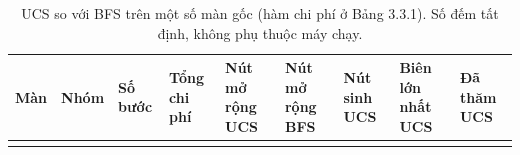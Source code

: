 \begin{longtable}[]{@{}
  >{\raggedright\arraybackslash}p{}
  >{\raggedright\arraybackslash}p{}
  >{\raggedright\arraybackslash}p{}
  >{\raggedright\arraybackslash}p{}
  >{\raggedright\arraybackslash}p{}
  >{\raggedright\arraybackslash}p{}
  >{\raggedright\arraybackslash}p{}
  >{\raggedright\arraybackslash}p{}
  >{\raggedright\arraybackslash}p{}@{}}
\caption{ UCS so với BFS trên một số màn gốc (hàm chi phí ở Bảng 3.3.1). Số đếm tất định, không phụ thuộc máy chạy.}\tabularnewline
\toprule\noalign{}
\rowcolor{tablehead}\begin{minipage}[b]{\linewidth}\raggedright
\textbf{Màn}
\end{minipage} & \begin{minipage}[b]{\linewidth}\raggedright
\textbf{Nhóm}
\end{minipage} & \begin{minipage}[b]{\linewidth}\raggedright
\textbf{Số bước}
\end{minipage} & \begin{minipage}[b]{\linewidth}\raggedright
\textbf{Tổng chi phí}
\end{minipage} & \begin{minipage}[b]{\linewidth}\raggedright
\textbf{Nút mở rộng UCS}
\end{minipage} & \begin{minipage}[b]{\linewidth}\raggedright
\textbf{Nút mở rộng BFS}
\end{minipage} & \begin{minipage}[b]{\linewidth}\raggedright
\textbf{Nút sinh UCS}
\end{minipage} & \begin{minipage}[b]{\linewidth}\raggedright
\textbf{Biên lớn nhất UCS}
\end{minipage} & \begin{minipage}[b]{\linewidth}\raggedright
\textbf{Đã thăm UCS}
\end{minipage} \\
\midrule\noalign{}
\endfirsthead
\toprule\noalign{}
\rowcolor{tablehead}\begin{minipage}[b]{\linewidth}\raggedright

\end{minipage}
\end{longtable}
